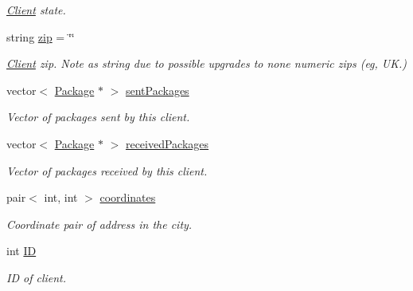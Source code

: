 \begin{DoxyCompactItemize}
\begin{DoxyCompactList}\small\item\em \hyperlink{classClient}{Client} state. \end{DoxyCompactList}\item 
string \hyperlink{classClient_a9ee92d218e3709abbd9448e162ea306f}{zip} = \char`\"{}\char`\"{}\hypertarget{classClient_a9ee92d218e3709abbd9448e162ea306f}{}\label{classClient_a9ee92d218e3709abbd9448e162ea306f}

\begin{DoxyCompactList}\small\item\em \hyperlink{classClient}{Client} zip. Note as string due to possible upgrades to none numeric zips (eg, UK.) \end{DoxyCompactList}\item 
vector$<$ \hyperlink{classPackage}{Package} $\ast$ $>$ \hyperlink{classClient_a2b2adb035b1729e5914a2ff85e672c88}{sent\+Packages}\hypertarget{classClient_a2b2adb035b1729e5914a2ff85e672c88}{}\label{classClient_a2b2adb035b1729e5914a2ff85e672c88}

\begin{DoxyCompactList}\small\item\em Vector of packages sent by this client. \end{DoxyCompactList}\item 
vector$<$ \hyperlink{classPackage}{Package} $\ast$ $>$ \hyperlink{classClient_ae0b61b806652c0dd46a5ef3e0308fb51}{received\+Packages}\hypertarget{classClient_ae0b61b806652c0dd46a5ef3e0308fb51}{}\label{classClient_ae0b61b806652c0dd46a5ef3e0308fb51}

\begin{DoxyCompactList}\small\item\em Vector of packages received by this client. \end{DoxyCompactList}\item 
pair$<$ int, int $>$ \hyperlink{classClient_a521946a39509ca76f9ef7bea68e47153}{coordinates}\hypertarget{classClient_a521946a39509ca76f9ef7bea68e47153}{}\label{classClient_a521946a39509ca76f9ef7bea68e47153}

\begin{DoxyCompactList}\small\item\em Coordinate pair of address in the city. \end{DoxyCompactList}\item 
int \hyperlink{classClient_a4c9ce60da7f62bf92891052bc20912b0}{ID}\hypertarget{classClient_a4c9ce60da7f62bf92891052bc20912b0}{}\label{classClient_a4c9ce60da7f62bf92891052bc20912b0}

\begin{DoxyCompactList}\small\item\em ID of client. \end{DoxyCompactList}\end{DoxyCompactItemize}
